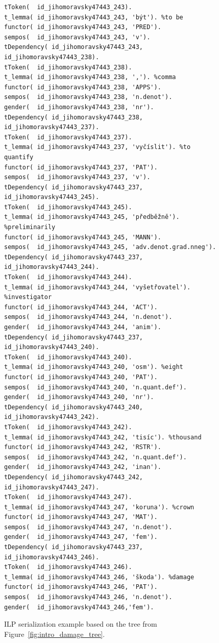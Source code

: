 \begin{figure}
\begin{verbatim}
tToken(  id_jihomoravsky47443_243).
t_lemma( id_jihomoravsky47443_243, 'být'). %to be
functor( id_jihomoravsky47443_243, 'PRED').
sempos(  id_jihomoravsky47443_243, 'v').
tDependency( id_jihomoravsky47443_243, id_jihomoravsky47443_238).
tToken(  id_jihomoravsky47443_238).
t_lemma( id_jihomoravsky47443_238, ','). %comma
functor( id_jihomoravsky47443_238, 'APPS').
sempos(  id_jihomoravsky47443_238, 'n.denot').
gender(  id_jihomoravsky47443_238, 'nr').
tDependency( id_jihomoravsky47443_238, id_jihomoravsky47443_237).
tToken(  id_jihomoravsky47443_237).
t_lemma( id_jihomoravsky47443_237, 'vyčíslit'). %to quantify
functor( id_jihomoravsky47443_237, 'PAT').
sempos(  id_jihomoravsky47443_237, 'v').
tDependency( id_jihomoravsky47443_237, id_jihomoravsky47443_245).
tToken(  id_jihomoravsky47443_245).
t_lemma( id_jihomoravsky47443_245, 'předběžně'). %preliminarily
functor( id_jihomoravsky47443_245, 'MANN').
sempos(  id_jihomoravsky47443_245, 'adv.denot.grad.nneg').
tDependency( id_jihomoravsky47443_237, id_jihomoravsky47443_244).
tToken(  id_jihomoravsky47443_244).
t_lemma( id_jihomoravsky47443_244, 'vyšetřovatel'). %investigator
functor( id_jihomoravsky47443_244, 'ACT').
sempos(  id_jihomoravsky47443_244, 'n.denot').
gender(  id_jihomoravsky47443_244, 'anim').
tDependency( id_jihomoravsky47443_237, id_jihomoravsky47443_240).
tToken(  id_jihomoravsky47443_240).
t_lemma( id_jihomoravsky47443_240, 'osm'). %eight
functor( id_jihomoravsky47443_240, 'PAT').
sempos(  id_jihomoravsky47443_240, 'n.quant.def').
gender(  id_jihomoravsky47443_240, 'nr').
tDependency( id_jihomoravsky47443_240, id_jihomoravsky47443_242).
tToken(  id_jihomoravsky47443_242).
t_lemma( id_jihomoravsky47443_242, 'tisíc'). %thousand
functor( id_jihomoravsky47443_242, 'RSTR').
sempos(  id_jihomoravsky47443_242, 'n.quant.def').
gender(  id_jihomoravsky47443_242, 'inan').
tDependency( id_jihomoravsky47443_242, id_jihomoravsky47443_247).
tToken(  id_jihomoravsky47443_247).
t_lemma( id_jihomoravsky47443_247, 'koruna'). %crown
functor( id_jihomoravsky47443_247, 'MAT').
sempos(  id_jihomoravsky47443_247, 'n.denot').
gender(  id_jihomoravsky47443_247, 'fem').
tDependency( id_jihomoravsky47443_237, id_jihomoravsky47443_246).
tToken(  id_jihomoravsky47443_246).
t_lemma( id_jihomoravsky47443_246, 'škoda'). %damage
functor( id_jihomoravsky47443_246, 'PAT').
sempos(  id_jihomoravsky47443_246, 'n.denot').
gender(  id_jihomoravsky47443_246,'fem').
\end{verbatim}
\caption{ILP serialization example based on the tree from Figure~\ref{fig:intro_damage_tree}.}
\label{fig:ilp_serialization}
\end{figure}








